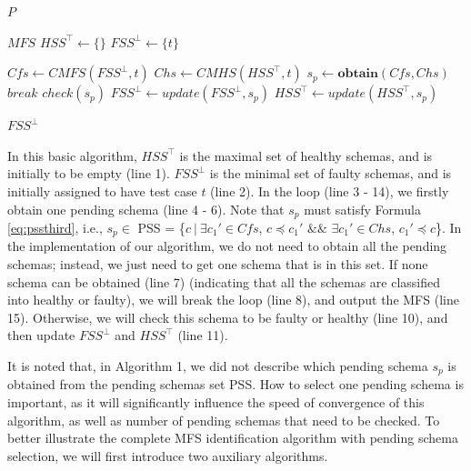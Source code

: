 \documentclass{sig-alternate-05-2015}
\begin{document}
{\begin{algorithm}[!htb]
\begin{algorithmic}[1]
     $P$ 

     \Ensure  $MFS$ 
    \State $HSS^{\top} \leftarrow \{\}$
    \State $FSS^{\bot} \leftarrow \{ t \} $
    \

        \State $Cfs \leftarrow CMFS(FSS^{\bot}, t) $
        \State $Chs \leftarrow CMHS(HSS^{\top}, t) $
        \State $s_{p} \leftarrow \textbf{obtain} (Cfs, Chs)$
            \State $break$
        \Else
            \State $check(s_{p})$
            \State $FSS^{\bot} \leftarrow update(FSS^{\bot}, s_{p})$
            \State $HSS^{\top} \leftarrow update(HSS^{\top}, s_{p})$
        \EndIf

    \EndWhile
     \State \Return $FSS^{\bot}$
  \end{algorithmic}
\end{algorithm}

In this basic algorithm, $HSS^{\top}$ is the maximal set of healthy schemas, and is initially to be empty (line 1). $FSS^{\bot}$ is the minimal set of faulty schemas, and is initially assigned to have test case $t$ (line 2). In the loop (line 3 - 14), we firstly obtain one pending schema (line 4 - 6).  Note that $s_{p}$ must satisfy Formula \ref{eq:pssthird}, i.e., $s_{p} \in$ PSS = \{$ c\ |\ \exists c_{1}' \in Cfs$, $c \preceq c_{1}'$ $\&\&$ $\exists c_{1}' \in Chs$, $c_{1}' \preceq c$\}. In the implementation of our algorithm, we do not need to obtain all the pending schemas; instead, we just need to get one schema that is in this set. If none schema can be obtained (line 7) (indicating that all the schemas are classified into healthy or faulty), we will break the loop (line 8), and output the MFS (line 15). Otherwise, we will check this schema to be faulty or healthy (line 10), and then update $FSS^{\bot}$ and $HSS^{\top}$ (line 11).

It is noted that, in Algorithm 1, we did not describe which pending schema $s_{p}$ is obtained from the pending schemas set PSS. How to select one pending schema is important, as it will significantly influence the speed of convergence of this algorithm, as well as number of pending schemas that need to be checked. To better illustrate the complete MFS identification algorithm with pending schema selection, we will first introduce two auxiliary algorithms.

}
\end{document}

